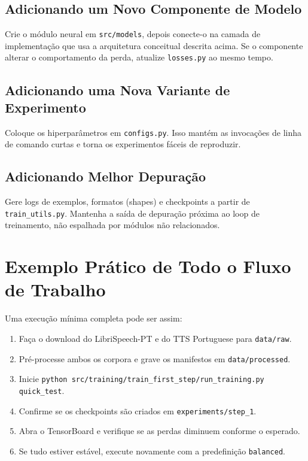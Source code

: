 \documentclass[11pt]{article}
\newcommand{\pathtt}[1]{\texttt{#1}}
\begin{document}
\subsection{Adicionando um Novo Componente de Modelo}

Crie o módulo neural em \pathtt{src/models}, depois conecte-o na camada de implementação que usa a arquitetura conceitual descrita acima. Se o componente alterar o comportamento da perda, atualize \pathtt{losses.py} ao mesmo tempo.

\subsection{Adicionando uma Nova Variante de Experimento}

Coloque os hiperparâmetros em \pathtt{configs.py}. Isso mantém as invocações de linha de comando curtas e torna os experimentos fáceis de reproduzir.

\subsection{Adicionando Melhor Depuração}

Gere logs de exemplos, formatos (shapes) e checkpoints a partir de \pathtt{train\_utils.py}. Mantenha a saída de depuração próxima ao loop de treinamento, não espalhada por módulos não relacionados.

\section{Exemplo Prático de Todo o Fluxo de Trabalho}

Uma execução mínima completa pode ser assim:

\begin{enumerate}[leftmargin=1.5em]
  \item Faça o download do LibriSpeech-PT e do TTS Portuguese para \pathtt{data/raw}.
  \item Pré-processe ambos os corpora e grave os manifestos em \pathtt{data/processed}.
  \item Inicie \pathtt{python src/training/train\_first\_step/run\_training.py quick\_test}.
  \item Confirme se os checkpoints são criados em \pathtt{experiments/step\_1}.
  \item Abra o TensorBoard e verifique se as perdas diminuem conforme o esperado.
  \item Se tudo estiver estável, execute novamente com a predefinição \pathtt{balanced}.
\end{enumerate}
\end{document}
